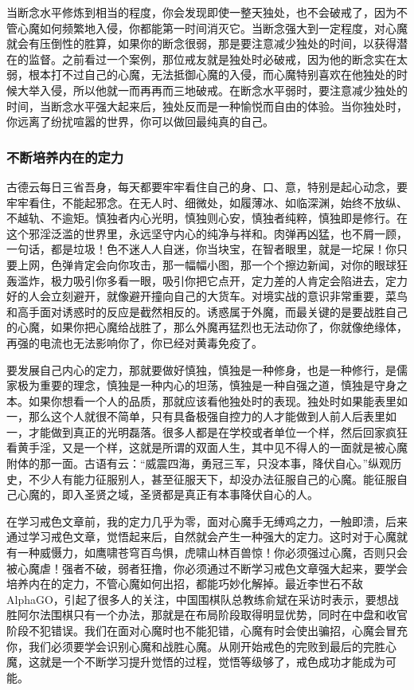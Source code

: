 当断念水平修炼到相当的程度，你会发现即使一整天独处，也不会破戒了，因为不管心魔如何频繁地入侵，你都能第一时间消灭它。当断念强大到一定程度，对心魔就会有压倒性的胜算，如果你的断念很弱，那是要注意减少独处的时间，以获得潜在的监督。之前看过一个案例，那位戒友就是独处时必破戒，因为他的断念实在太弱，根本打不过自己的心魔，无法抵御心魔的入侵，而心魔特别喜欢在他独处的时候大举入侵，所以他就一而再再而三地破戒。在断念水平弱时，要注意减少独处的时间，当断念水平强大起来后，独处反而是一种愉悦而自由的体验。当你独处时，你远离了纷扰喧嚣的世界，你可以做回最纯真的自己。

\subsubsection{不断培养内在的定力}

古德云每日三省吾身，每天都要牢牢看住自己的身、口、意，特别是起心动念，要牢牢看住，不能起邪念。在无人时、细微处，如履薄冰、如临深渊，始终不放纵、不越轨、不逾矩。慎独者内心光明，慎独则心安，慎独者纯粹，慎独即是修行。在这个邪淫泛滥的世界里，永远坚守内心的纯净与祥和。肉弹再凶猛，也不屑一顾，一句话，都是垃圾！色不迷人人自迷，你当块宝，在智者眼里，就是一坨屎！你只要上网，色弹肯定会向你攻击，那一幅幅小图，那一个个擦边新闻，对你的眼球狂轰滥炸，极力吸引你多看一眼，吸引你把它点开，定力差的人肯定会陷进去，定力好的人会立刻避开，就像避开撞向自己的大货车。对境实战的意识非常重要，菜鸟和高手面对诱惑时的反应是截然相反的。诱惑属于外魔，而最关键的是要战胜自己的心魔，如果你把心魔给战胜了，那么外魔再猛烈也无法动你了，你就像绝缘体，再强的电流也无法影响你了，你已经对黄毒免疫了。

要发展自己内心的定力，那就要做好慎独，慎独是一种修身，也是一种修行，是儒家极为重要的理念，慎独是一种内心的坦荡，慎独是一种自强之道，慎独是守身之本。如果你想看一个人的品质，那就应该看他独处时的表现。独处时如果能表里如一，那么这个人就很不简单，只有具备极强自控力的人才能做到人前人后表里如一，才能做到真正的光明磊落。很多人都是在学校或者单位一个样，然后回家疯狂看黄手淫，又是一个样，这就是所谓的双面人生，其中见不得人的一面就是被心魔附体的那一面。古语有云：“威震四海，勇冠三军，只没本事，降伏自心。”纵观历史，不少人有能力征服别人，甚至征服天下，却没办法征服自己的心魔。能征服自己心魔的，即入圣贤之域，圣贤都是真正有本事降伏自心的人。

在学习戒色文章前，我的定力几乎为零，面对心魔手无缚鸡之力，一触即溃，后来通过学习戒色文章，觉悟起来后，自然就会产生一种强大的定力。这时对于心魔就有一种威慑力，如鹰啸苍穹百鸟惧，虎啸山林百兽惊！你必须强过心魔，否则只会被心魔虐！强者不破，弱者狂撸，你必须通过不断学习戒色文章强大起来，要学会培养内在的定力，不管心魔如何出招，都能巧妙化解掉。最近李世石不敌 AlphaGO，引起了很多人的关注，中国围棋队总教练俞斌在采访时表示，要想战胜阿尔法围棋只有一个办法，那就是在布局阶段取得明显优势，同时在中盘和收官阶段不犯错误。我们在面对心魔时也不能犯错，心魔有时会使出骗招，心魔会冒充你，我们必须要学会识别心魔和战胜心魔。从刚开始戒色的完败到最后的完胜心魔，这就是一个不断学习提升觉悟的过程，觉悟等级够了，戒色成功才能成为可能。

